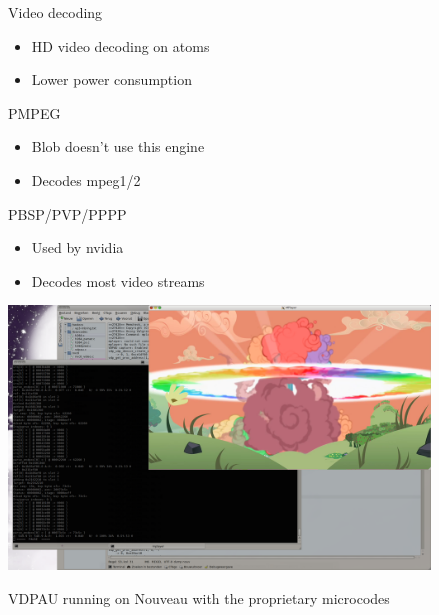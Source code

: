 \documentclass[11pt,english,compress]{beamer}
\begin{document}
		\begin{frame}
			\begin{block}{Video decoding}
				\begin{itemize}
					\item HD video decoding on atoms
					\item Lower power consumption
				\end{itemize}
			\end{block}

			\begin{block}{PMPEG}
				\begin{itemize}
					\item Blob doesn't use this engine
					\item Decodes mpeg1/2
				\end{itemize}
			\end{block}

			\begin{block}{PBSP/PVP/PPPP}
				\begin{itemize}
					\item Used by nvidia
					\item Decodes most video streams
				\end{itemize}
			\end{block}
		\end{frame}

		\begin{frame}
			\begin{center}
				\includegraphics[height=7cm]{imgs/h264_vp_decoded2.png}
			\end{center}
			\begin{center}
				VDPAU running on Nouveau with the proprietary microcodes
			\end{center}
		\end{frame}
\end{document}
